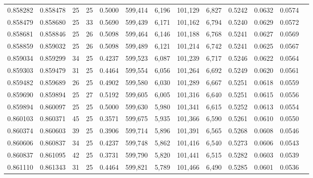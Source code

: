 \begin{tabular}{rrrrrrrrrrrrr}
0.858282 & 0.858478 &    25 &  25 &                                     0.5000 & 599,414 &   6,196 & 101,129 &   6,827 & 0.5242 & 0.0632 & 0.0574 \\
0.858479 & 0.858680 &    25 &  33 &                                     0.5690 & 599,439 &   6,171 & 101,162 &   6,794 & 0.5240 & 0.0629 & 0.0572 \\
0.858681 & 0.858846 &    25 &  26 &                                     0.5098 & 599,464 &   6,146 & 101,188 &   6,768 & 0.5241 & 0.0627 & 0.0569 \\
0.858859 & 0.859032 &    25 &  26 &                                     0.5098 & 599,489 &   6,121 & 101,214 &   6,742 & 0.5241 & 0.0625 & 0.0567 \\
0.859034 & 0.859299 &    34 &  25 &                                     0.4237 & 599,523 &   6,087 & 101,239 &   6,717 & 0.5246 & 0.0622 & 0.0564 \\
0.859303 & 0.859479 &    31 &  25 &                                     0.4464 & 599,554 &   6,056 & 101,264 &   6,692 & 0.5249 & 0.0620 & 0.0561 \\
0.859482 & 0.859689 &    26 &  25 &                                     0.4902 & 599,580 &   6,030 & 101,289 &   6,667 & 0.5251 & 0.0618 & 0.0559 \\
0.859690 & 0.859894 &    25 &  27 &                                     0.5192 & 599,605 &   6,005 & 101,316 &   6,640 & 0.5251 & 0.0615 & 0.0556 \\
0.859894 & 0.860097 &    25 &  25 &                                     0.5000 & 599,630 &   5,980 & 101,341 &   6,615 & 0.5252 & 0.0613 & 0.0554 \\
0.860103 & 0.860371 &    45 &  25 &                                     0.3571 & 599,675 &   5,935 & 101,366 &   6,590 & 0.5261 & 0.0610 & 0.0550 \\
0.860374 & 0.860603 &    39 &  25 &                                     0.3906 & 599,714 &   5,896 & 101,391 &   6,565 & 0.5268 & 0.0608 & 0.0546 \\
0.860606 & 0.860837 &    34 &  25 &                                     0.4237 & 599,748 &   5,862 & 101,416 &   6,540 & 0.5273 & 0.0606 & 0.0543 \\
0.860837 & 0.861095 &    42 &  25 &                                     0.3731 & 599,790 &   5,820 & 101,441 &   6,515 & 0.5282 & 0.0603 & 0.0539 \\
0.861110 & 0.861343 &    31 &  25 &                                     0.4464 & 599,821 &   5,789 & 101,466 &   6,490 & 0.5285 & 0.0601 & 0.0536 \\

\end{tabular}
